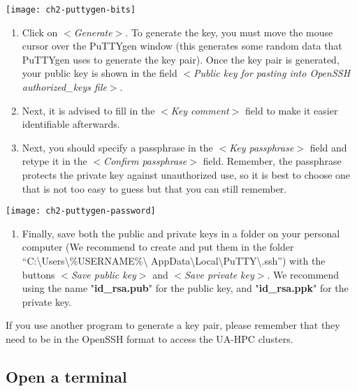   \texttt{[image: ch2-puttygen-bits]}

  \begin{enumerate}
    \item  Click on $<$\textit{Generate}$>$. To generate the key, you must move
      the mouse cursor over the PuTTYgen window (this generates some random
      data that PuTTYgen uses to generate the key pair). Once the key pair is
      generated, your public key is shown in the field $<$\textit{Public key for pasting into OpenSSH authorized\_keys file}$>$.
    \item  Next, it is advised to fill in the $<$\textit{Key comment}$>$ field
      to make it easier identifiable afterwards.
    \item  Next, you should specify a passphrase in the $<$\textit{Key passphrase}$>$
      field and retype it in the $<$\textit{Confirm passphrase}$>$ field.
      Remember, the passphrase protects the private key against unauthorized
      use, so it is best to choose one that is not too easy to guess but that
      you can still remember.
  \end{enumerate}

  \texttt{[image: ch2-puttygen-password]}

  \begin{enumerate}
    \item  Finally, save both the public and private keys in a folder on your
      personal computer (We recommend to create and put them in the folder
      ``C:\textbackslash Users\textbackslash \%USERNAME\%\textbackslash
      AppData\textbackslash Local\textbackslash PuTTY\textbackslash .ssh'')
      with the buttons $<$\textit{Save public key}$>$ and $<$\textit{Save private key}$>$.
      We recommend using the name "\textbf{id\_rsa.pub}" for the public key,
      and "\textbf{id\_rsa.ppk}" for the private key.
  \end{enumerate}

  If you use another program to generate a key pair, please remember that they need to be in the OpenSSH format to access the UA-HPC clusters.

\fi


\ifmac

  \subsection{Open a terminal}
  \label{sec:open-a-terminal}

